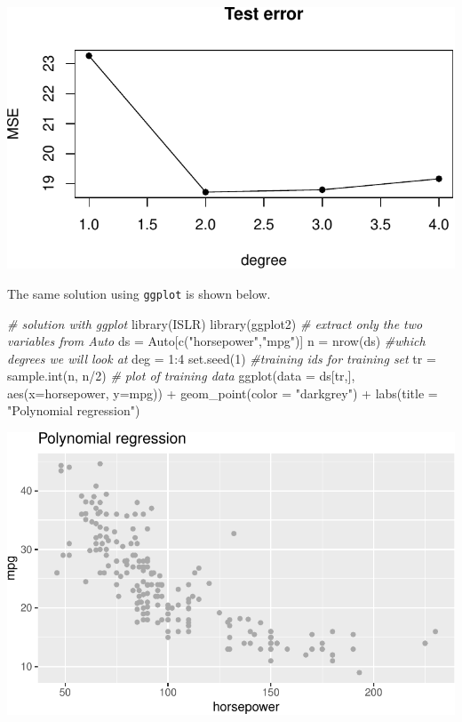 \documentclass[
]{article}
\newenvironment{Shaded}{\begin{snugshade}}{\end{snugshade}}
\newcommand{\AttributeTok}[1]{\textcolor[rgb]{0.77,0.63,0.00}{#1}}
\newcommand{\CommentTok}[1]{\textcolor[rgb]{0.56,0.35,0.01}{\textit{#1}}}
\newcommand{\DecValTok}[1]{\textcolor[rgb]{0.00,0.00,0.81}{#1}}
\newcommand{\FunctionTok}[1]{\textcolor[rgb]{0.00,0.00,0.00}{#1}}
\newcommand{\NormalTok}[1]{#1}
\newcommand{\OtherTok}[1]{\textcolor[rgb]{0.56,0.35,0.01}{#1}}
\newcommand{\SpecialCharTok}[1]{\textcolor[rgb]{0.00,0.00,0.00}{#1}}
\newcommand{\StringTok}[1]{\textcolor[rgb]{0.31,0.60,0.02}{#1}}
\begin{document}
\includegraphics{RecEx7-sol_files/figure-latex/unnamed-chunk-1-2.pdf}

The same solution using \texttt{ggplot} is shown below.

\begin{Shaded}
\begin{Highlighting}[]
\CommentTok{\# solution with ggplot}
\FunctionTok{library}\NormalTok{(ISLR)}
\FunctionTok{library}\NormalTok{(ggplot2)}
\CommentTok{\# extract only the two variables from Auto}
\NormalTok{ds }\OtherTok{=}\NormalTok{ Auto[}\FunctionTok{c}\NormalTok{(}\StringTok{"horsepower"}\NormalTok{,}\StringTok{"mpg"}\NormalTok{)]}
\NormalTok{n }\OtherTok{=} \FunctionTok{nrow}\NormalTok{(ds)}
\CommentTok{\#which degrees we will look at}
\NormalTok{deg }\OtherTok{=} \DecValTok{1}\SpecialCharTok{:}\DecValTok{4}
\FunctionTok{set.seed}\NormalTok{(}\DecValTok{1}\NormalTok{)}
\CommentTok{\#training ids for training set}
\NormalTok{tr }\OtherTok{=} \FunctionTok{sample.int}\NormalTok{(n, n}\SpecialCharTok{/}\DecValTok{2}\NormalTok{)}
\CommentTok{\# plot of training data}
\FunctionTok{ggplot}\NormalTok{(}\AttributeTok{data =}\NormalTok{ ds[tr,], }\FunctionTok{aes}\NormalTok{(}\AttributeTok{x=}\NormalTok{horsepower, }\AttributeTok{y=}\NormalTok{mpg)) }\SpecialCharTok{+} \FunctionTok{geom\_point}\NormalTok{(}\AttributeTok{color =} \StringTok{"darkgrey"}\NormalTok{) }\SpecialCharTok{+} 
  \FunctionTok{labs}\NormalTok{(}\AttributeTok{title =} \StringTok{"Polynomial regression"}\NormalTok{)}
\end{Highlighting}
\end{Shaded}

\includegraphics{RecEx7-sol_files/figure-latex/unnamed-chunk-2-1.pdf}
\end{document}
